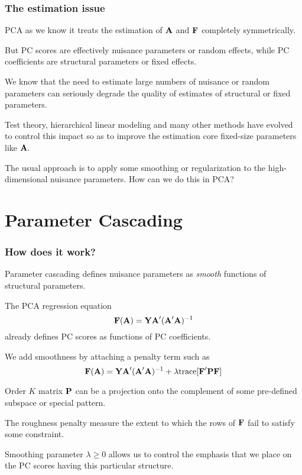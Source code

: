 \documentclass[11pt]{beamer}
\begin{document}
\begin{frame}

\frametitle{The estimation issue}

\bi
  \item PCA as we know it treats the estimation of $\mbox{\bf A}$ and $\mbox{\bf F}$ completely symmetrically.
  \item But PC scores are effectively nuisance parameters or random effects, while PC coefficients are structural parameters or fixed effects.
  \item We know that the need to estimate large numbers of nuisance or random parameters can seriously degrade the quality of estimates of structural or fixed parameters.
  \item Test theory, hierarchical linear modeling and many other methods have evolved to control
  this impact so as to improve the estimation core fixed-size parameters like $\mbox{\bf A}.$
  \item The usual approach is to apply some smoothing or regularization to the high-dimensional nuisance parameters.  How can we do this in PCA?
\ei

\end{frame}


\section{Parameter Cascading}


\begin{frame}

\frametitle{How does it work?}

\bi
  \item Parameter cascading defines nuisance parameters as \emph{smooth} functions of
  structural parameters.
  \item The PCA regression equation
  \[
    \mbox{\bf F}(\mbox{\bf A}) = \mbox{\bf Y} \mbox{\bf A}' (\mbox{\bf A}' \mbox{\bf A})^{-1}
  \]
  already defines PC scores as functions of PC coefficients.
  \item We add smoothness by attaching a penalty term such as
  \[
    \mbox{\bf F}(\mbox{\bf A}) = \mbox{\bf Y} \mbox{\bf A}' (\mbox{\bf A}' \mbox{\bf A})^{-1} + \lambda \mbox{trace} [ \mbox{\bf F}' \mbox{\bf P} \mbox{\bf F} ]
  \]
  \item Order $K$ matrix $\mbox{\bf P}$ can be a projection onto the complement of some pre-defined subspace or special pattern.
  \item The roughness penalty measure the extent to which the rows of $\mbox{\bf F}$ fail to satisfy some
  constraint.
  \item Smoothing parameter $\lambda \geq 0$ allows us to control the emphasis that we place on
  the PC scores having this particular structure.
\ei

\end{frame}
\end{document}
